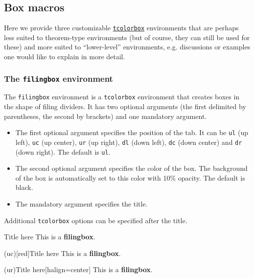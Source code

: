 \subsection{Box macros}

Here we provide three customizable \href{https://ctan.org/pkg/tcolorbox}{\texttt{tcolorbox}} environments that are perhaps less suited to theorem-type environments (but of course, they can still be used for these) and more suited to ``lower-level'' environments, e.g. discussions or examples one would like to explain in more detail.

\subsubsection*{The \texttt{filingbox} environment}

The \texttt{filingbox} environment is a \texttt{tcolorbox} environment that creates boxes in the shape of filing dividers. It has two optional arguments (the first delimited by parentheses, the second by brackets) and one mandatory argument.
\begin{itemize}
    \item The first optional argument specifies the position of the tab. It can be \texttt{ul} (up left), \texttt{uc} (up center), \texttt{ur} (up right), \texttt{dl} (down left), \texttt{dc} (down center) and \texttt{dr} (down right). The default is \texttt{ul}.
    \item The second optional argument specifies the color of the box. The background of the box is automatically set to this color with 10\% opacity. The default is black.
    \item The mandatory argument specifies the title.
\end{itemize}
Additional \texttt{tcolorbox} options can be specified after the title.

\begin{verbbox}
\begin{filingbox}{Title here}
This is a \textbf{filingbox}.
\end{filingbox}
\end{verbbox}

\begin{verbbox}
\begin{filingbox}(uc)[red]{Title here}
This is a \textbf{filingbox}.
\end{filingbox}
\end{verbbox}

\begin{verbbox}
\begin{filingbox}(ur){Title here}[halign=center]
This is a \textbf{filingbox}.
\end{filingbox}
\end{verbbox}

